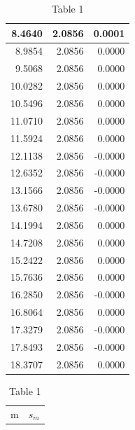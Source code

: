 \documentclass[a4paper,11pt]{article}
\begin{document}
\begin{table}[H]
\begin{subtable}{.5\linewidth}
\begin{adjustbox}{height =9cm ,center}
\begin{tabular}{|r|r|r|}
\hline                       
8.4640 & 2.0856 & 0.0001 \\  
\hline                       
8.9854 & 2.0856 & 0.0000 \\  
\hline                       
9.5068 & 2.0856 & 0.0000 \\  
\hline                       
10.0282 & 2.0856 & 0.0000 \\ 
\hline                       
10.5496 & 2.0856 & 0.0000 \\ 
\hline                       
11.0710 & 2.0856 & 0.0000 \\ 
\hline                       
11.5924 & 2.0856 & 0.0000 \\ 
\hline                       
12.1138 & 2.0856 & -0.0000 \\
\hline                       
12.6352 & 2.0856 & -0.0000 \\
\hline                       
13.1566 & 2.0856 & -0.0000 \\
\hline                       
13.6780 & 2.0856 & -0.0000 \\
\hline                       
14.1994 & 2.0856 & 0.0000 \\ 
\hline                       
14.7208 & 2.0856 & 0.0000 \\ 
\hline                       
15.2422 & 2.0856 & 0.0000 \\ 
\hline                       
15.7636 & 2.0856 & 0.0000 \\ 
\hline                       
16.2850 & 2.0856 & -0.0000 \\
\hline                       
16.8064 & 2.0856 & 0.0000 \\ 
\hline                       
17.3279 & 2.0856 & -0.0000 \\
\hline                       
17.8493 & 2.0856 & -0.0000 \\
\hline                       
18.3707 & 2.0856 & 0.0000 \\ 
\hline                       
\end{tabular}         
\end{adjustbox}       
\caption{Table 1}         
\label{table:Q2}             
\end{subtable}%
\begin{subtable}[t]{.5\textwidth} 
\begin{adjustbox}{height =9cm ,center}        
\centering                   
\begin{tabular}{|c|c|}      
\hline 
m& $s_{m}$\\

\end{tabular}
\end{adjustbox}
\end{subtable}
\end{table}
\end{document}

